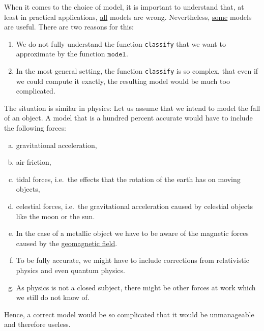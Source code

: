 When it comes to the choice of model, it is important to understand that, at least in practical applications,
\underline{all} models are wrong.  Nevertheless, \underline{some} models are useful.  There are two reasons for this:
\begin{enumerate}
\item We do not fully understand the function \texttt{classify} that we want to approximate by the function $\mathtt{model}$.
\item In the most general setting, the function \texttt{classify} is so complex, that even if we could compute
      it exactly, the resulting model would be much too complicated.
\end{enumerate}
The situation is similar in physics: Let us assume that we intend to model the fall of an object.  A model that is a
hundred percent accurate would have to include the following forces:
\begin{enumerate}[(a)]
\item gravitational acceleration,
\item air friction, 
\item tidal forces, i.e.~the effects that the rotation of the earth has on moving objects,
\item celestial forces, i.e.~the gravitational acceleration caused by celestial objects like the moon or the
      sun.
\item In the case of a metallic object we have to be aware of the magnetic forces
      caused by the \href{https://www.britannica.com/science/geomagnetic-field}{geomagnetic field}.
\item To be fully accurate, we might have to include corrections from relativistic physics and even quantum
      physics.   
\item As physics is not a closed subject, there might be other forces at work which we still do not know of. 
\end{enumerate}
Hence, a correct model would be so complicated that it would be unmanageable and therefore useless. 

